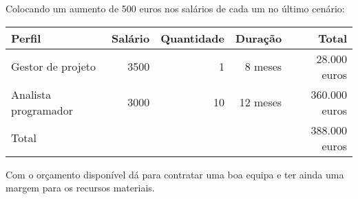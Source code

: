 Colocando um aumento de 500 euros nos salários de cada um no último cenário:

\begin{table}[h!]
    \centering
    \begin{tabular}{|l|r|r|r|r|}
        \hline
        \textbf{Perfil} & \textbf{Salário} & \textbf{Quantidade} & \textbf{Duração} & \textbf{Total} \\
        \hline
        Gestor de projeto & 3500 & 1 & 8 meses & 28.000 euros\\
        \hline
        Analista programador & 3000 & 10 & 12 meses & 360.000 euros\\
        \hline
        Total & & & & 388.000 euros \\
        \hline
    \end{tabular}
\end{table}


Com o orçamento disponível dá para contratar uma boa equipa e ter ainda uma margem para os recursos materiais.

